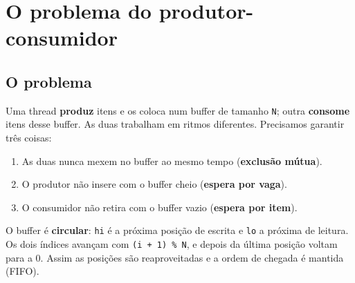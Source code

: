 \documentclass[11pt,a4paper]{article}
\newcommand{\cmd}[1]{\texttt{#1}}
\begin{document}
\section{O problema do produtor-consumidor}

\subsection{O problema}

Uma thread \textbf{produz} itens e os coloca num buffer de tamanho \cmd{N}; outra \textbf{consome} itens desse buffer. As duas trabalham em ritmos diferentes. Precisamos garantir três coisas:

\begin{enumerate}
    \item As duas nunca mexem no buffer ao mesmo tempo (\textbf{exclusão mútua}).
    \item O produtor não insere com o buffer cheio (\textbf{espera por vaga}).
    \item O consumidor não retira com o buffer vazio (\textbf{espera por item}).
\end{enumerate}

\begin{center}
\end{center}

O buffer é \textbf{circular}: \cmd{hi} é a próxima posição de escrita e \cmd{lo} a próxima de leitura. Os dois índices avançam com \cmd{(i + 1) \% N}, e depois da última posição voltam para a 0. Assim as posições são reaproveitadas e a ordem de chegada é mantida (FIFO).
\end{document}
